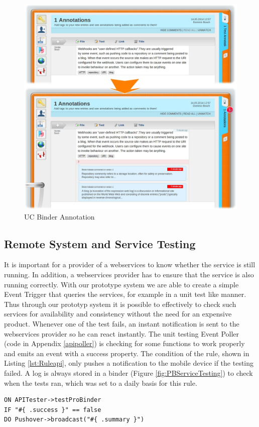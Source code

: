 \begin{figure}[!ht]
	\centering
  \includegraphics[width=\textwidth]{figures/UC_Binder_Annotations}
	\caption{UC Binder Annotation}
	\label{fig:UC_Binder_Annotations}
\end{figure}



\subsection{Remote System and Service Testing}
It is important for a provider of a \textrm{\glspl{webservice}} to know whether the service is still running.
In addition, a \textrm{\glspl{webservice}} provider has to ensure that the service is also running correctly.
With our prototype system we are able to create a simple \textrm{Event Trigger} that queries the services, for example in a unit test like manner.
Thus through our prototyp system it is possible to effectively to check such services for availability and consistency without the need for an expensive product.
Whenever one of the test fails, an instant notification is sent to the \textrm{\glspl{webservice}} provider so he can react instantly.
The unit testing \textrm{Event Poller} (code in Appendix \ref{apipoller}) is checking for some functions to work properly and emits an event with a success property.
The condition of the rule, shown in Listing \ref{lst:Ruleapi}, only pushes a notification to the mobile device if the testing failed.
A log is always stored in a binder (Figure \ref{fig:PBServiceTesting}) to check when the tests ran, which was set to a daily basis for this rule.
\begin{lstlisting}[float=h,language=OwnRule,label={lst:Ruleapi},caption=Rule Phrase for ProBinder WebAPI Testing]
ON APITester->testProBinder
IF "#{ .success }" == false
DO Pushover->broadcast("#{ .summary }")
\end{lstlisting}

